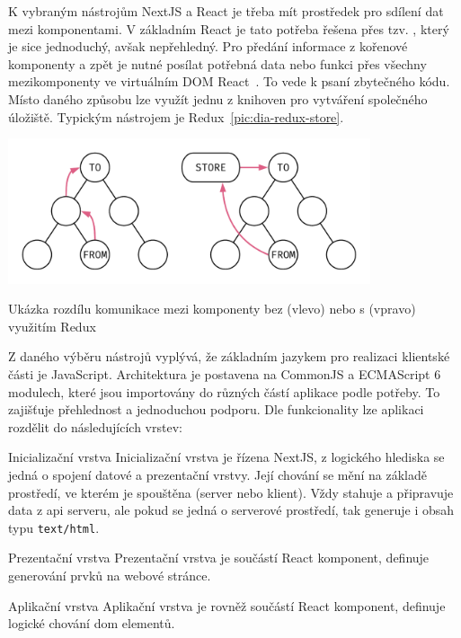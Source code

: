 K vybraným nástrojům NextJS a React je třeba mít prostředek pro sdílení dat mezi komponentami. V základním React je tato potřeba řešena přes tzv. , který je sice jednoduchý, avšak nepřehledný. Pro předání informace z kořenové komponenty a zpět je nutné posílat potřebná data nebo funkci přes všechny mezikomponenty ve virtuálním DOM React~\cite{reactLifting}. To vede k psaní zbytečného kódu. Místo daného způsobu lze využít jednu z knihoven pro vytváření společného úložiště. Typickým nástrojem je Redux~\ref{pic:dia-redux-store}.

\begin{fig:illustration}
   \includegraphics[width=0.8\textwidth]{images/dia-redux-store.pdf}
   \caption{Ukázka rozdílu komunikace mezi komponenty bez (vlevo) nebo s (vpravo) využitím Redux}\label{pic:dia-redux-store}
\end{fig:illustration}


Z daného výběru nástrojů vyplývá, že základním jazykem pro realizaci klientské části je JavaScript. Architektura je postavena na CommonJS a ECMAScript 6 modulech, které jsou importovány do různých částí aplikace podle potřeby. To zajišťuje přehlednost a jednoduchou podporu. Dle funkcionality lze aplikaci rozdělit do následujících vrstev:

\begin{dl}
   \item [Inicializační vrstva] Inicializační vrstva je řízena NextJS, z logického hlediska se jedná o spojení datové a prezentační vrstvy. Její chování se mění na základě prostředí, ve kterém je spouštěna (server nebo klient). Vždy stahuje a připravuje data z \gls{api} serveru, ale pokud se jedná o serverové prostředí, tak generuje i obsah typu \texttt{text/html}.
   
   \item [Prezentační vrstva] Prezentační vrstva je součástí React komponent, definuje generování prvků na webové stránce. 
   
   \item [Aplikační vrstva] Aplikační vrstva je rovněž součástí React komponent, definuje logické chování \gls{dom} elementů.
\end{dl}



